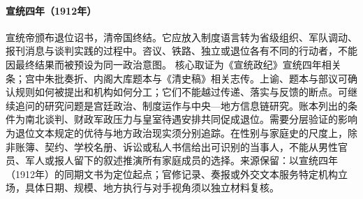 \hypertarget{public:EQ-1912-QING-ABDICATION}{}\paragraph{宣统四年（1912年）}宣统帝颁布退位诏书，清帝国终结。它应放入制度语言转为省级组织、军队调动、报刊消息与谈判实践的过程中。咨议、铁路、独立或退位各有不同的行动者，不能因最终结果而被预设为同一政治意图。 核心取证为《宣统政纪》宣统四年相关条；宫中朱批奏折、内阁大库题本与《清史稿》相关志传。上谕、题本与部议可确认规则如何被提出和机构如何分工；它们不能越过传递、落实与反馈的断点。可继续追问的研究问题是宫廷政治、制度运作与中央—地方信息链研究。账本列出的条件为南北谈判、财政军政压力与皇室待遇安排共同促成退位。需要分层验证的影响为退位文本规定的优待与地方政治现实须分别追踪。在性别与家庭史的尺度上，除非账簿、契约、学校名册、诉讼或私人书信给出可识别的当事人，不能从男性官员、军人或报人留下的叙述推演所有家庭成员的选择。来源保留：以宣统四年（1912年）的同期文书为定位起点；官修记录、奏报或外交文本服务特定机构立场，具体日期、规模、地方执行与对手视角须以独立材料复核。
